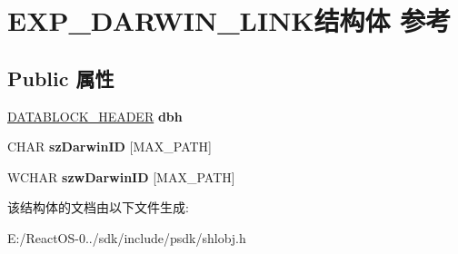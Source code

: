 \hypertarget{struct_e_x_p___d_a_r_w_i_n___l_i_n_k}{}\section{E\+X\+P\+\_\+\+D\+A\+R\+W\+I\+N\+\_\+\+L\+I\+N\+K结构体 参考}
\label{struct_e_x_p___d_a_r_w_i_n___l_i_n_k}
\subsection*{Public 属性}
\begin{DoxyCompactItemize}
\item 
\mbox{\label{struct_e_x_p___d_a_r_w_i_n___l_i_n_k_ae7f6baafaf4bccf4142ca6ef77fadca0}} 
\hyperlink{structtag_d_a_t_a_b_l_o_c_k_h_e_a_d_e_r}{D\+A\+T\+A\+B\+L\+O\+C\+K\+\_\+\+H\+E\+A\+D\+ER} {\bfseries dbh}
\item 
\mbox{\label{struct_e_x_p___d_a_r_w_i_n___l_i_n_k_aa8369aa5f649033b1628c5fbf88d6312}} 
C\+H\+AR {\bfseries sz\+Darwin\+ID} \mbox{[}M\+A\+X\+\_\+\+P\+A\+TH\mbox{]}
\item 
\mbox{\label{struct_e_x_p___d_a_r_w_i_n___l_i_n_k_ab6f46e98fc7a8e41c2f6f03bd63ca58e}} 
W\+C\+H\+AR {\bfseries szw\+Darwin\+ID} \mbox{[}M\+A\+X\+\_\+\+P\+A\+TH\mbox{]}
\end{DoxyCompactItemize}


该结构体的文档由以下文件生成\+:\begin{DoxyCompactItemize}
\item 
E\+:/\+React\+O\+S-\/0../sdk/include/psdk/shlobj.\+h\end{DoxyCompactItemize}

